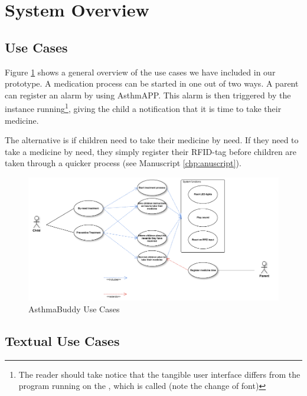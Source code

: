 \section{System Overview}
\label{sec:systemoverview}

\subsection{Use Cases}
Figure \ref{fig:pi-use-cases} shows a general overview of the use cases we have included in our prototype. A medication process can be started in one out of two ways. 
A parent can register an alarm by using AsthmAPP. This alarm is then triggered by the  instance running\footnote{The reader should take notice that the tangible user interface \ab{} differs from the program running on the \rpi{}, which is called (note the change of font)}, giving the child a notification that it is time to take their medicine.

The alternative is if children need to take their medicine by need. If they need to take a medicine by need, they simply register their RFID-tag before children are taken through a quicker process (see Manuscript \ref{chp:anuscript}).  

\begin{figure}[H] 
	\centering
		\includegraphics[width=0.8\paperwidth]{Pictures/usecases.png}
	\caption{AsthmaBuddy Use Cases}
	\label{fig:pi-use-cases}
\end{figure}

\subsection{Textual Use Cases}
\label{sec:textualusecasebyneed}

